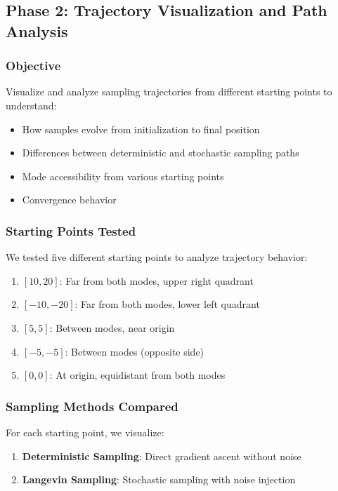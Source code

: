 \documentclass[12pt,a4paper]{article}
\begin{document}
\subsection{Phase 2: Trajectory Visualization and Path Analysis}

\subsubsection{Objective}

Visualize and analyze sampling trajectories from different starting points to understand:
\begin{itemize}
    \item How samples evolve from initialization to final position
    \item Differences between deterministic and stochastic sampling paths
    \item Mode accessibility from various starting points
    \item Convergence behavior
\end{itemize}

\subsubsection{Starting Points Tested}

We tested five different starting points to analyze trajectory behavior:
\begin{enumerate}
    \item $[10, 20]$: Far from both modes, upper right quadrant
    \item $[-10, -20]$: Far from both modes, lower left quadrant
    \item $[5, 5]$: Between modes, near origin
    \item $[-5, -5]$: Between modes (opposite side)
    \item $[0, 0]$: At origin, equidistant from both modes
\end{enumerate}

\subsubsection{Sampling Methods Compared}

For each starting point, we visualize:
\begin{enumerate}
    \item \textbf{Deterministic Sampling}: Direct gradient ascent without noise
    \item \textbf{Langevin Sampling}: Stochastic sampling with noise injection
\end{enumerate}
\end{document}
